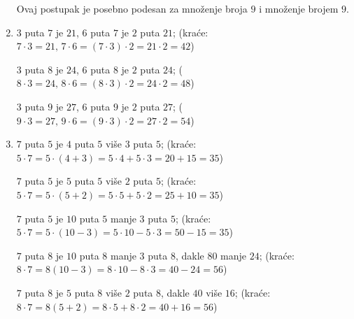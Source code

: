 \documentclass[a4paper,12pt]{book}
\begin{document}
\begin{enumerate}
        Ovaj postupak je posebno podesan za mno\v zenje broja $9$ i mno\v zenje brojem $9$.
        \item $3$ puta $7$ je $21$, $6$ puta $7$ je $2$ puta $21$;
            (kra\' ce: $7 \cdot 3 = 21,\, 7 \cdot 6 = (7 \cdot 3) \cdot 2 = 21 \cdot 2 = 42$)
            
            $3$ puta $8$ je $24$, $6$ puta $8$ je $2$ puta $24$;
            ($8 \cdot 3 = 24,\, 8 \cdot 6 = (8 \cdot 3) \cdot 2 = 24 \cdot 2 = 48$)

            $3$ puta $9$ je $27$, $6$ puta $9$ je $2$ puta $27$;
            ($9 \cdot 3 = 27,\, 9 \cdot 6 = (9 \cdot 3) \cdot 2 = 27 \cdot 2 = 54$)
        \item $7$ puta $5$ je $4$ puta $5$ vi\v se $3$ puta $5$;
            (kra\' ce: $5 \cdot 7 = 5 \cdot (4 + 3) = 5 \cdot 4 + 5 \cdot 3 = 20 + 15 = 35$)

            $7$ puta $5$ je $5$ puta $5$ vi\v se $2$ puta $5$;
            (kra\' ce: $5 \cdot 7 = 5 \cdot (5 + 2) = 5 \cdot 5 + 5 \cdot 2 = 25 + 10 = 35$)

            $7$ puta $5$ je $10$ puta $5$ manje $3$ puta $5$;
            (kra\' ce: $5 \cdot 7 = 5 \cdot (10 - 3) = 5 \cdot 10 - 5 \cdot 3 = 50 - 15 = 35$)

            $7$ puta $8$ je $10$ puta $8$ manje $3$ puta $8$, dakle $80$ manje $24$;
            (kra\' ce: $8 \cdot 7 = 8(10 - 3) = 8 \cdot 10 - 8 \cdot 3 = 40 - 24 = 56$)

            $7$ puta $8$ je $5$ puta $8$ vi\v se $2$ puta $8$, dakle $40$ vi\v se $16$;
            (kra\' ce: $8 \cdot 7 = 8 (5 + 2) = 8 \cdot 5 + 8 \cdot 2 = 40 + 16 = 56$)
    \end{enumerate}
    
\end{document}
